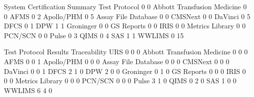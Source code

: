 \documentclass{article}
\begin{document}
\begin{Schunk}
\begin{Soutput}
                              System Certification Summary Test Protocol
                                                         0             0
  Abbott Transfusion Medicine                            0             0
  AFMS                                                   0             2
  Apollo/PHM                                             0             5
  Assay File Database                                    0             0
  CMSNext                                                0             0
  DaVinci                                                0             5
  DFCS                                                   0             1
  DPW                                                    1             1
  Groninger                                              0             0
  GS Reports                                             0             0
  IRIS                                                   0             0
  Metrics Library                                        0             0
  PCN/SCN                                                0             0
  Pulse                                                  0             3
  QIMS                                                   0             4
  SAS                                                    1             1
  WWLIMS                                                 0            15
                             
                              Test Protocol Results Traceability URS
                                                  0            0   0
  Abbott Transfusion Medicine                     0            0   0
  AFMS                                            0            0   1
  Apollo/PHM                                      0            0   0
  Assay File Database                             0            0   0
  CMSNext                                         0            0   0
  DaVinci                                         0            0   1
  DFCS                                            2            1   0
  DPW                                             2            0   0
  Groninger                                       0            1   0
  GS Reports                                      0            0   0
  IRIS                                            0            0   0
  Metrics Library                                 0            0   0
  PCN/SCN                                         0            0   0
  Pulse                                           3            1   0
  QIMS                                            0            2   0
  SAS                                             1            0   0
  WWLIMS                                          6            4   0
                             

\end{Soutput}
\end{Schunk}
\end{document}
